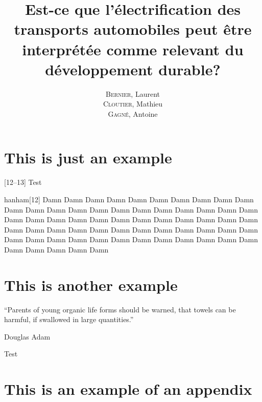 \documentclass[12pt]{GDD}
\author{%
    \textsc{Bernier}, Laurent \\%
    \textsc{Cloutier}, Mathieu \\%
    \textsc{Gagné}, Antoine%
}
\title{Est-ce que l’électrification des transports automobiles peut être interprétée comme relevant du développement durable?}
\begin{document}
\chapter{This is just an example}
\lipsum%
[12--13]
Test

\begin{quoting}{hanham}[12]
    Damn Damn Damn Damn Damn Damn Damn Damn Damn Damn Damn Damn Damn Damn Damn Damn Damn Damn Damn Damn Damn Damn Damn Damn Damn Damn Damn Damn Damn Damn Damn Damn Damn Damn Damn Damn Damn Damn Damn Damn Damn Damn Damn Damn Damn Damn Damn Damn Damn Damn Damn Damn Damn Damn Damn Damn Damn Damn Damn Damn Damn Damn Damn
\end{quoting}


\chapter{This is another example}
\epigraph{``Parents of young organic life forms should be warned, that towels can be harmful, if swallowed in large quantities.''}{Douglas Adam}
\lipsum%
Test

\printbibliography[heading=bibintoc]%

\appendix

\chapter{This is an example of an appendix}
\lipsum%
\end{document}
